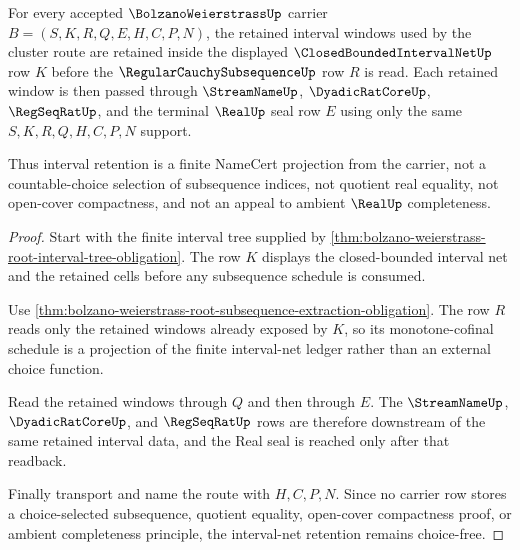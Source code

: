 \begin{theorem}
\label{thm:bolzano-weierstrass-interval-net-choice-free-retention}
For every accepted $\BolzanoWeierstrassUp$ carrier $B=(S,K,R,Q,E,H,C,P,N)$, the retained interval windows used by the cluster route are retained inside the displayed $\ClosedBoundedIntervalNetUp$ row $K$ before the $\RegularCauchySubsequenceUp$ row $R$ is read. Each retained window is then passed through $\StreamNameUp$, $\DyadicRatCoreUp$, $\RegSeqRatUp$, and the terminal $\RealUp$ seal row $E$ using only the same $S,K,R,Q,H,C,P,N$ support.

Thus interval retention is a finite NameCert projection from the carrier, not a countable-choice selection of subsequence indices, not quotient real equality, not open-cover compactness, and not an appeal to ambient $\RealUp$ completeness.
\end{theorem}
\begin{proof}
Start with the finite interval tree supplied by \autoref{thm:bolzano-weierstrass-root-interval-tree-obligation}. The row $K$ displays the closed-bounded interval net and the retained cells before any subsequence schedule is consumed.

Use \autoref{thm:bolzano-weierstrass-root-subsequence-extraction-obligation}. The row $R$ reads only the retained windows already exposed by $K$, so its monotone-cofinal schedule is a projection of the finite interval-net ledger rather than an external choice function.

Read the retained windows through $Q$ and then through $E$. The $\StreamNameUp$, $\DyadicRatCoreUp$, and $\RegSeqRatUp$ rows are therefore downstream of the same retained interval data, and the Real seal is reached only after that readback.

Finally transport and name the route with $H,C,P,N$. Since no carrier row stores a choice-selected subsequence, quotient equality, open-cover compactness proof, or ambient completeness principle, the interval-net retention remains choice-free.
\end{proof}


